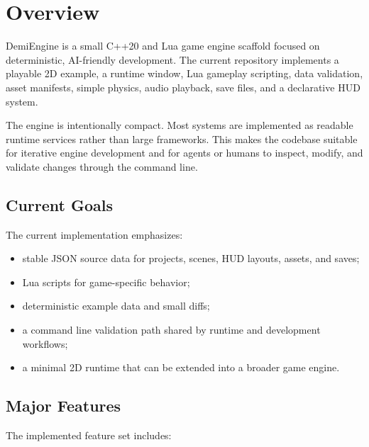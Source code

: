 \chapter{Overview}

DemiEngine is a small C++20 and Lua game engine scaffold focused on deterministic, AI-friendly development. The current repository implements a playable 2D example, a runtime window, Lua gameplay scripting, data validation, asset manifests, simple physics, audio playback, save files, and a declarative HUD system.

The engine is intentionally compact. Most systems are implemented as readable runtime services rather than large frameworks. This makes the codebase suitable for iterative engine development and for agents or humans to inspect, modify, and validate changes through the command line.

\section{Current Goals}

The current implementation emphasizes:

\begin{itemize}
  \item stable JSON source data for projects, scenes, HUD layouts, assets, and saves;
  \item Lua scripts for game-specific behavior;
  \item deterministic example data and small diffs;
  \item a command line validation path shared by runtime and development workflows;
  \item a minimal 2D runtime that can be extended into a broader game engine.
\end{itemize}

\section{Major Features}

The implemented feature set includes:

